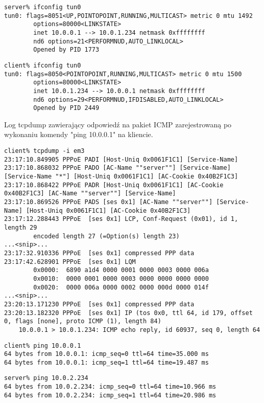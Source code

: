 \documentclass[a4paper,11pt]{article}
\begin{document}
\begin{verbatim}
server% ifconfig tun0
tun0: flags=8051<UP,POINTOPOINT,RUNNING,MULTICAST> metric 0 mtu 1492
        options=80000<LINKSTATE>
        inet 10.0.0.1 --> 10.0.1.234 netmask 0xffffffff
        nd6 options=21<PERFORMNUD,AUTO_LINKLOCAL>
        Opened by PID 1773
\end{verbatim}

\begin{verbatim}
client% ifconfig tun0
tun0: flags=8050<POINTOPOINT,RUNNING,MULTICAST> metric 0 mtu 1500
        options=80000<LINKSTATE>
        inet 10.0.1.234 --> 10.0.0.1 netmask 0xffffffff
        nd6 options=29<PERFORMNUD,IFDISABLED,AUTO_LINKLOCAL>
        Opened by PID 2449
\end{verbatim}

Log tcpdump zawierający odpowiedź na pakiet ICMP zarejestrowaną po wykonaniu komendy "ping 10.0.0.1" na kliencie.
\begin{verbatim}
client% tcpdump -i em3
23:17:10.849905 PPPoE PADI [Host-Uniq 0x0061F1C1] [Service-Name]
23:17:10.868032 PPPoE PADO [AC-Name ""server""] [Service-Name] [Service-Name "*"] [Host-Uniq 0x0061F1C1] [AC-Cookie 0x40B2F1C3]
23:17:10.868422 PPPoE PADR [Host-Uniq 0x0061F1C1] [AC-Cookie 0x40B2F1C3] [AC-Name ""server""] [Service-Name]
23:17:10.869526 PPPoE PADS [ses 0x1] [AC-Name ""server""] [Service-Name] [Host-Uniq 0x0061F1C1] [AC-Cookie 0x40B2F1C3]
23:17:12.288443 PPPoE  [ses 0x1] LCP, Conf-Request (0x01), id 1, length 29
        encoded length 27 (=Option(s) length 23)
...<snip>...
23:17:32.910336 PPPoE  [ses 0x1] compressed PPP data
23:17:42.628901 PPPoE  [ses 0x1] LQM
        0x0000:  6890 a1d4 0000 0001 0000 0003 0000 006a
        0x0010:  0000 0001 0000 0003 0000 0000 0000 0000
        0x0020:  0000 006a 0000 0002 0000 000d 0000 014f
...<snip>...
23:20:13.171230 PPPoE  [ses 0x1] compressed PPP data
23:20:13.182320 PPPoE  [ses 0x1] IP (tos 0x0, ttl 64, id 179, offset 0, flags [none], proto ICMP (1), length 84)
    10.0.0.1 > 10.0.1.234: ICMP echo reply, id 60937, seq 0, length 64
\end{verbatim}

\begin{verbatim}
client% ping 10.0.0.1
64 bytes from 10.0.0.1: icmp_seq=0 ttl=64 time=35.000 ms
64 bytes from 10.0.0.1: icmp_seq=1 ttl=64 time=19.487 ms
\end{verbatim}

\begin{verbatim}
server% ping 10.0.2.234
64 bytes from 10.0.2.234: icmp_seq=0 ttl=64 time=10.966 ms
64 bytes from 10.0.2.234: icmp_seq=1 ttl=64 time=20.986 ms
\end{verbatim}
\end{document}
